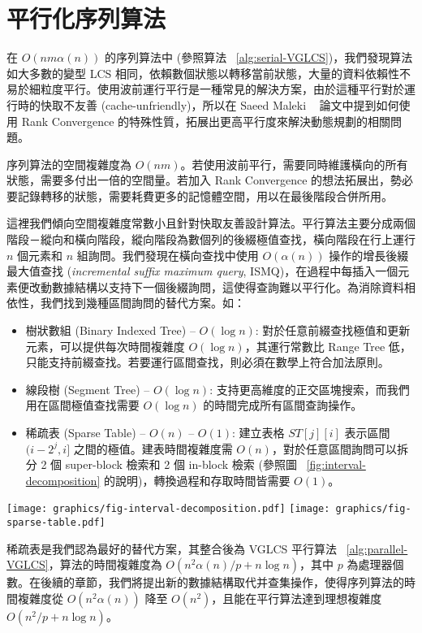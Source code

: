 \section{平行化序列算法} %
\label{sec:parallelSerial}

在 $O(nm \alpha(n))$ 的序列算法中 (參照算法 ~\ref{alg:serial-VGLCS})，我們發現算法如大多數的變型 LCS 相同，依賴數個狀態以轉移當前狀態，大量的資料依賴性不易於細粒度平行。使用波前運行平行是一種常見的解決方案，由於這種平行對於運行時的快取不友善 (cache-unfriendly)，所以在 Saeed Maleki ~\cite{saeed} 論文中提到如何使用 Rank Convergence 的特殊性質，拓展出更高平行度來解決動態規劃的相關問題。



序列算法的空間複雜度為 $O(nm)$。若使用波前平行，需要同時維護橫向的所有狀態，需要多付出一倍的空間量。若加入 Rank Convergence 的想法拓展出，勢必要記錄轉移的狀態，需要耗費更多的記憶體空間，用以在最後階段合併所用。

這裡我們傾向空間複雜度常數小且針對快取友善設計算法。平行算法主要分成兩個階段－縱向和橫向階段，縱向階段為數個列的後綴極值查找，橫向階段在行上運行 $n$ 個元素和 $n$ 組詢問。我們發現在橫向查找中使用 $O(\alpha(n))$ 操作的增長後綴最大值查找 (\emph{incremental suffix maximum query}, ISMQ)，在過程中每插入一個元素便改動數據結構以支持下一個後綴詢問，這使得查詢難以平行化。為消除資料相依性，我們找到幾種區間詢問的替代方案。如：

\begin{itemize}
  \item 樹狀數組 (Binary Indexed Tree) -- $O(\log n)$: 對於任意前綴查找極值和更新元素，可以提供每次時間複雜度 $O(\log n)$，其運行常數比 Range Tree 低，只能支持前綴查找。若要運行區間查找，則必須在數學上符合加法原則。
  \item 線段樹 (Segment Tree) -- $O(\log n)$: 支持更高維度的正交區塊搜索，而我們用在區間極值查找需要 $O(\log n)$ 的時間完成所有區間查詢操作。
  \item 稀疏表 (Sparse Table) -- $O(n)$ -- $O(1)$:
    建立表格 $ST[j][i]$ 表示區間 $(i-2^j,i]$ 之間的極值。建表時間複雜度需 $O(n)$，對於任意區間詢問可以拆分 2 個 super-block 檢索和 2 個 in-block 檢索 (參照圖 ~\ref{fig:interval-decomposition} 的說明)，轉換過程和存取時間皆需要 $O(1)$。
\end{itemize}

\begin{figure*}[!thb]
  \centering
  \texttt{[image: graphics/fig-interval-decomposition.pdf]}
  \texttt{[image: graphics/fig-sparse-table.pdf]}
  \caption{給定一陣列 $A$ 如上圖所述，並且拆成 5 個區塊，每個區塊皆有 4 個元素，若詢問區間 $[2, 18]$ 的最大值，將分成 $B1$ 的內部詢問 (in-block query) $Q_L$、$B5$ 的內部詢問 $Q_R$ 和兩個跨區間詢問 (super-block query) $SQ_L$、$SQ_R$}
  \label{fig:interval-decomposition}
\end{figure*}

稀疏表是我們認為最好的替代方案，其整合後為 VGLCS 平行算法 ~\ref{alg:parallel-VGLCS}，算法的時間複雜度為 $O(n^2 \alpha(n) / p + n \log n)$，其中 $p$ 為處理器個數。在後續的章節，我們將提出新的數據結構取代并查集操作，使得序列算法的時間複雜度從 $O(n^2 \alpha(n))$ 降至 $O(n^2)$，且能在平行算法達到理想複雜度 $O(n^2 / p + n \log n)$。

